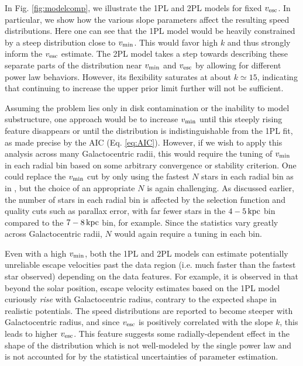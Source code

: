 In Fig. \ref{fig:modelcomp}, we illustrate the 1PL and 2PL models for fixed $v_{\rm{esc}}$. In particular, we show how the various slope parameters affect the resulting speed distributions. Here one can see that the 1PL model would be heavily constrained by a steep distribution close to $v_{\rm{min}}$. This would favor high $k$ and thus strongly inform the $v_{\rm{esc}}$ estimate. The 2PL model takes a step towards describing these separate parts of the distribution near $v_{\rm{min}}$ and $v_{\rm{esc}}$ by allowing for different power law behaviors. However, its flexibility saturates at about $ k \simeq 15$, indicating that continuing to increase the upper prior limit further will not be sufficient. 
%

Assuming the problem lies only in disk contamination or the inability to model substructure, one approach would be to increase $v_{\rm{min}}$ until this steeply rising feature disappears or until the distribution is indistinguishable from the 1PL fit, as made precise by the AIC (Eq. \ref{eq:AIC}).
However, if we wish to apply this analysis across many Galactocentric radii, this would require the tuning of $v_{\rm{min}}$ in each radial bin based on some arbitrary convergence or stability criterion. One could replace the $v_{\rm{min}}$ cut by only using the fastest $N$ stars in each radial bin as in \cite{Koppelman2021}, but the choice of an appropriate $N$ is again challenging. As discussed earlier, the number of stars in each radial bin is affected by the selection function and quality cuts such as parallax error, with far fewer stars in the $4-5\,\rm{kpc}$ bin compared to the $7-8\,\rm{kpc}$ bin, for example. Since the statistics vary greatly across Galactocentric radii, $N$ would again require a tuning in each bin.

Even with a high $v_{\rm{min}}$, both the 1PL and 2PL models can estimate potentially unreliable escape velocities past the data region (i.e. much faster than the fastest star observed) depending on the data features. For example, it is observed in \cite{Koppelman2021} that beyond the solar position, escape velocity estimates based on the 1PL model curiously {\emph{rise}} with Galactocentric radius, contrary to the expected shape in realistic potentials. The speed distributions are reported to become steeper with Galactocentric radius, and since $v_{\rm{esc}}$ is positively correlated with the slope $k$, this leads to higher $v_{\rm{esc}}$. This feature suggests some radially-dependent effect in the shape of the distribution which is not well-modeled by the single power law and is not accounted for by the statistical uncertainties of parameter estimation. 

